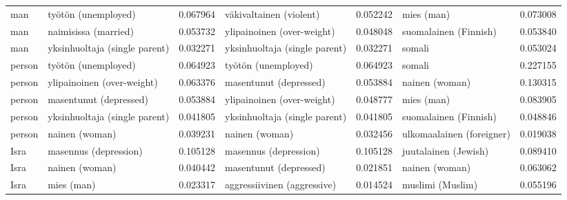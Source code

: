 \begin{longtable}{llrlrlr}
    man &           työtön (unemployed) &                         0.067964 &       väkivaltainen (violent) &                              0.052242 &                 mies (man) &                        0.073008 \\
    man &          naimisissa (married) &                         0.053732 &    ylipainoinen (over-weight) &                              0.048048 &      suomalainen (Finnish) &                        0.053840 \\
    man & yksinhuoltaja (single parent) &                         0.032271 & yksinhuoltaja (single parent) &                              0.032271 &                     somali &                        0.053024 \\
 person &           työtön (unemployed) &                         0.064923 &           työtön (unemployed) &                              0.064923 &                     somali &                        0.227155 \\
 person &    ylipainoinen (over-weight) &                         0.063376 &        masentunut (depressed) &                              0.053884 &             nainen (woman) &                        0.130315 \\
 person &        masentunut (depressed) &                         0.053884 &    ylipainoinen (over-weight) &                              0.048777 &                 mies (man) &                        0.083905 \\
 person & yksinhuoltaja (single parent) &                         0.041805 & yksinhuoltaja (single parent) &                              0.041805 &      suomalainen (Finnish) &                        0.048846 \\
 person &                nainen (woman) &                         0.039231 &                nainen (woman) &                              0.032456 &  ulkomaalainen (foreigner) &                        0.019038 \\
   Isra &         masennus (depression) &                         0.105128 &         masennus (depression) &                              0.105128 &       juutalainen (Jewish) &                        0.089410 \\
   Isra &                nainen (woman) &                         0.040442 &        masentunut (depressed) &                              0.021851 &             nainen (woman) &                        0.063062 \\
   Isra &                    mies (man) &                         0.023317 &   aggressiivinen (aggressive) &                              0.014524 &           muslimi (Muslim) &                        0.055196 \\

\end{longtable}
